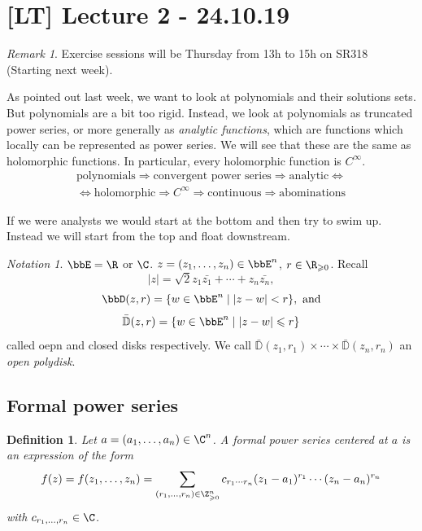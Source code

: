 \documentclass[A4paper, british]{amsart}
\theoremstyle{darkgreentheorem}
\theoremstyle{darkbluedefinition}
\newtheorem{defn}[thm]{Definition}
\theoremstyle{darkredexample}
\theoremstyle{remark}
\newtheorem{rem}[thm]{Remark}
\newtheorem{nota}[thm]{Notation}
\newcommand{\cbbD}{\bar{\mathbb{D}}}
\newcommand{\1}{\mathbbm{1}}
\begin{document}
\section{[LT] Lecture 2 - 24.10.19}

\begin{rem}
    Exercise sessions will be Thursday from 13h to 15h on SR318 (Starting next week).
\end{rem}

As pointed out last week, we want to look at polynomials and their solutions sets.
But polynomials are a bit too rigid.
Instead, we look at polynomials as truncated power series, or more generally as \textit{analytic functions}, which are functions which locally can be represented as power series.
We will see that these are the same as holomorphic functions.
In particular, every holomorphic function is $C^{\infty}$.
\begin{multline*}
    \text{polynomials} \Rightarrow \text{convergent power series} \Rightarrow \text{analytic} \Leftrightarrow \\
    \Leftrightarrow \text{holomorphic} \Rightarrow C^{\infty}\Rightarrow \text{continuous} \Rightarrow \text{abominations}
\end{multline*}

If we were analysts we would start at the bottom and then try to swim up.
Instead we will start from the top and float downstream.

\begin{nota}
    $\bbE=\R$ or $\C$.
    $z=(z_{1},\ldots,z_{n})\in \bbE^{n}$, $r\in \R_{\geqslant 0}$.
    Recall
    \[ |z|=\sqrt{2}{z_{1}\bar{z_{1}}+\cdots + z_{n}\bar{z_{n}}}, \]
    \[ \bbD(z,r)=\{w\in \bbE^{n}\mid |z-w|<r\}, \text{ and} \]
    \[ \cbbD(z,r)=\{ w\in \bbE^{n}\mid |z-w|\leqslant r\} \]
    called oepn and closed disks respectively.
    We call $\cbbD(z_{1},r_{1})\times \cdots \times \cbbD(z_{n},r_{n})$ an \textit{open polydisk}.
\end{nota}

\subsection{Formal power series}

\begin{defn}
    Let $a=(a_{1},\ldots,a_{n})\in \C^{n}$.
    A \textit{formal power series} centered at $a$ is an expression of the form
    \[ f(z)=f(z_{1},\ldots,z_{n})=\sum_{(r_{1},\ldots, r_{n})\in \Z^{n}_{\geqslant 0}}c_{r_{1}\cdots r_{n}}(z_{1}-a_{1})^{r_{1}}\cdots (z_{n}-a_{n})^{r_{n}} \]
    with $c_{r_{1},\ldots,r_{n}}\in \C$.
\end{defn}
\end{document}
